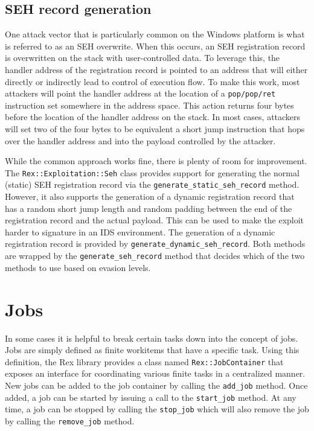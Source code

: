 \documentclass{report}
\begin{document}
        \subsection{SEH record generation}

\par
One attack vector that is particularly common on the Windows
platform is what is referred to as an SEH overwrite.  When this
occurs, an SEH registration record is overwritten on the stack with
user-controlled data.  To leverage this, the handler address of the
registration record is pointed to an address that will either
directly or indirectly lead to control of execution flow.  To make
this work, most attackers will point the handler address at the
location of a \texttt{pop/pop/ret} instruction set somewhere in the
address space. This action returns four bytes before the location of
the handler address on the stack.  In most cases, attackers will set
two of the four bytes to be equivalent a short jump instruction that
hops over the handler address and into the payload controlled by the
attacker.

\par
While the common approach works fine, there is plenty of room for
improvement.  The \texttt{Rex::Exploitation::Seh} class provides
support for generating the normal (static) SEH registration record
via the \texttt{generate\_static\_seh\_record} method.  However, it
also supports the generation of a dynamic registration record that
has a random short jump length and random padding between the end of
the registration record and the actual payload.  This can be used to
make the exploit harder to signature in an IDS environment.  The
generation of a dynamic registration record is provided by
\texttt{generate\_dynamic\_seh\_record}.  Both methods are wrapped
by the \texttt{generate\_seh\_record} method that decides which of
the two methods to use based on evasion levels.

    \section{Jobs}
    \label{rex-jobs}

\par
In some cases it is helpful to break certain tasks down into the
concept of jobs.  Jobs are simply defined as finite workitems that
have a specific task.  Using this definition, the Rex library
provides a class named \texttt{Rex::JobContainer} that exposes an
interface for coordinating various finite tasks in a centralized
manner. New jobs can be added to the job container by calling the
\texttt{add\_job} method.  Once added, a job can be started by
issuing a call to the \texttt{start\_job} method.  At any time, a
job can be stopped by calling the \texttt{stop\_job} which will also
remove the job by calling the \texttt{remove\_job} method.
\end{document}
